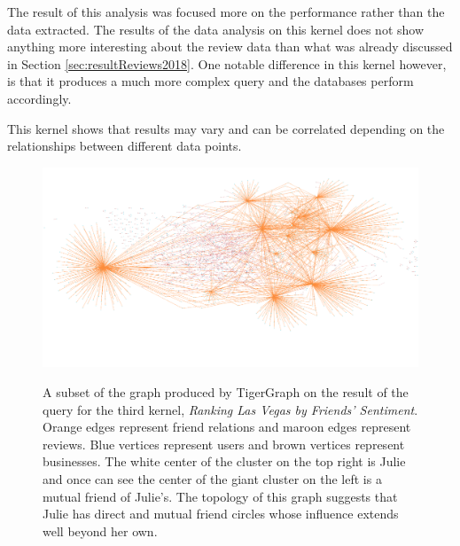 
The result of this analysis was focused more on the performance rather than the data extracted. The results of the data analysis on this kernel does not show anything more interesting about the review data than what was already discussed in Section \ref{sec:resultReviews2018}. One notable difference in this kernel however, is that it produces a much more complex query and the databases perform accordingly.

This kernel shows that results may vary and can be correlated depending on the relationships between different data points.

\begin{figure}[h]
    \centering
    \begin{mdframed}[backgroundcolor=gray!70!white, style=GraphFrame]
    {\includegraphics[width=\textwidth]{img/cityAnalysisGraphs/julie-businesses.png}}
    \end{mdframed}
    \caption{A subset of the graph produced by TigerGraph on the result of the query for the third kernel, \emph{Ranking Las Vegas by Friends’ Sentiment}. Orange edges represent friend relations and maroon edges represent reviews. Blue vertices represent users and brown vertices represent businesses. The white center of the cluster on the top right is Julie and once can see the center of the giant cluster on the left is a mutual friend of Julie's. The topology of this graph suggests that Julie has direct and mutual friend circles whose influence extends well beyond her own.}
    \label{fig:cityGraph}
\end{figure}

